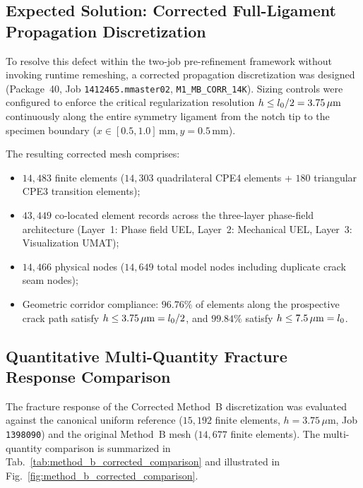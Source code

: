 \subsection{Expected Solution: Corrected Full-Ligament Propagation Discretization}
\label{subsec:method_b_corrected_solution}

To resolve this defect within the two-job pre-refinement framework without invoking runtime remeshing, a corrected propagation discretization was designed (Package~40, Job \texttt{1412465.mmaster02}, \texttt{M1\_MB\_CORR\_14K}). Sizing controls were configured to enforce the critical regularization resolution $h \le l_0 / 2 = 3.75\,\mu\mathrm{m}$ continuously along the entire symmetry ligament from the notch tip to the specimen boundary ($x \in [0.5, 1.0]\,\mathrm{mm}, y = 0.5\,\mathrm{mm}$).

The resulting corrected mesh comprises:
\begin{itemize}
  \item $14{,}483$ finite elements ($14{,}303$ quadrilateral CPE4 elements + $180$ triangular CPE3 transition elements);
  \item $43{,}449$ co-located element records across the three-layer phase-field architecture (Layer~1: Phase field UEL, Layer~2: Mechanical UEL, Layer~3: Visualization UMAT);
  \item $14{,}466$ physical nodes ($14{,}649$ total model nodes including duplicate crack seam nodes);
  \item Geometric corridor compliance: $96.76\%$ of elements along the prospective crack path satisfy $h \le 3.75\,\mu\mathrm{m} = l_0 / 2$, and $99.84\%$ satisfy $h \le 7.5\,\mu\mathrm{m} = l_0$.
\end{itemize}

\subsection{Quantitative Multi-Quantity Fracture Response Comparison}
\label{subsec:method_b_corrected_quantitative}

The fracture response of the Corrected Method~B discretization was evaluated against the canonical uniform reference ($15{,}192$ finite elements, $h = 3.75\,\mu\mathrm{m}$, Job \texttt{1398090}) and the original Method~B mesh ($14{,}677$ finite elements). The multi-quantity comparison is summarized in Tab.~\ref{tab:method_b_corrected_comparison} and illustrated in Fig.~\ref{fig:method_b_corrected_comparison}.

